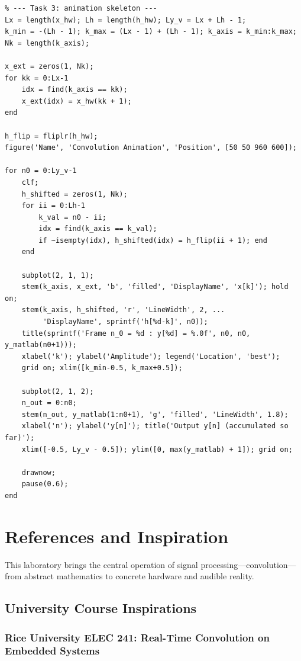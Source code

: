 \documentclass[11pt,letterpaper]{article}
\begin{document}
\begin{verbatim}
% --- Task 3: animation skeleton ---
Lx = length(x_hw); Lh = length(h_hw); Ly_v = Lx + Lh - 1;
k_min = -(Lh - 1); k_max = (Lx - 1) + (Lh - 1); k_axis = k_min:k_max;
Nk = length(k_axis);

x_ext = zeros(1, Nk);
for kk = 0:Lx-1
    idx = find(k_axis == kk);
    x_ext(idx) = x_hw(kk + 1);
end

h_flip = fliplr(h_hw);
figure('Name', 'Convolution Animation', 'Position', [50 50 960 600]);

for n0 = 0:Ly_v-1
    clf;
    h_shifted = zeros(1, Nk);
    for ii = 0:Lh-1
        k_val = n0 - ii;
        idx = find(k_axis == k_val);
        if ~isempty(idx), h_shifted(idx) = h_flip(ii + 1); end
    end

    subplot(2, 1, 1);
    stem(k_axis, x_ext, 'b', 'filled', 'DisplayName', 'x[k]'); hold on;
    stem(k_axis, h_shifted, 'r', 'LineWidth', 2, ...
         'DisplayName', sprintf('h[%d-k]', n0));
    title(sprintf('Frame n_0 = %d : y[%d] = %.0f', n0, n0, y_matlab(n0+1)));
    xlabel('k'); ylabel('Amplitude'); legend('Location', 'best');
    grid on; xlim([k_min-0.5, k_max+0.5]);

    subplot(2, 1, 2);
    n_out = 0:n0;
    stem(n_out, y_matlab(1:n0+1), 'g', 'filled', 'LineWidth', 1.8);
    xlabel('n'); ylabel('y[n]'); title('Output y[n] (accumulated so far)');
    xlim([-0.5, Ly_v - 0.5]); ylim([0, max(y_matlab) + 1]); grid on;

    drawnow;
    pause(0.6);
end
\end{verbatim}

\clearpage

\section*{References and Inspiration}

This laboratory brings the central operation of signal processing—convolution—from abstract mathematics to concrete hardware and audible reality.

\subsection*{University Course Inspirations}

\subsubsection*{Rice University ELEC 241: Real-Time Convolution on Embedded Systems}
\end{document}
